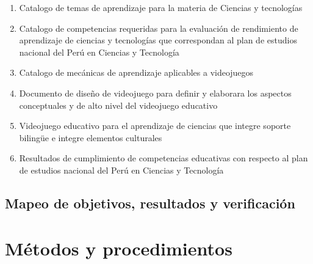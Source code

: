 \begin{enumerate}[label=R\arabic*.,itemsep=5pt]
    \item Catalogo de temas de aprendizaje para la materia de Ciencias y tecnologías
    \item Catalogo de competencias requeridas para la evaluación de rendimiento de aprendizaje de ciencias y tecnologías que correspondan al plan de estudios nacional del Perú en Ciencias y Tecnología
    \item Catalogo de mecánicas de aprendizaje aplicables a videojuegos
    \item Documento de diseño de videojuego para definir y elaborara los aspectos conceptuales y de alto nivel del videojuego educativo
    \item Videojuego educativo para el aprendizaje de ciencias que integre soporte bilingüe e integre elementos culturales

    \item Resultados de cumplimiento de competencias educativas con respecto al plan de estudios nacional del Perú en Ciencias y Tecnología
\end{enumerate}


\subsection{Mapeo de objetivos, resultados y verificación}

\section{Métodos y procedimientos}